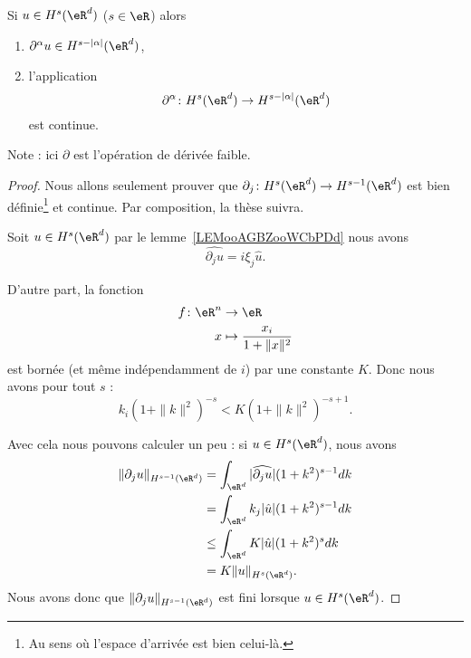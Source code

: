 \begin{proposition}
    Si \( u\in H^s(\eR^d)\) (\( s\in \eR\)) alors
    \begin{enumerate}
        \item
            \( \partial^{\alpha}u\in H^{s-| \alpha |}(\eR^d)\),
        \item
            l'application
            \begin{equation}
                \partial^{\alpha}\colon H^s(\eR^d)\to H^{s-| \alpha |}(\eR^d)
            \end{equation}
            est continue.
    \end{enumerate}
\end{proposition}
Note : ici \( \partial\) est l'opération de dérivée faible.

\begin{proof}
    Nous allons seulement prouver que \( \partial_j\colon H^s(\eR^d)\to  H^{s-1}(\eR^d) \) est bien définie\footnote{Au sens où l'espace d'arrivée est bien celui-là.} et continue. Par composition, la thèse suivra.

    Soit \( u\in H^s(\eR^d)\) par le lemme~\ref{LEMooAGBZooWCbPDd} nous avons
    \begin{equation}
        \widehat{\partial_ju}=i\xi_j\hat u.
    \end{equation}

    D'autre part, la fonction
    \begin{equation}
        \begin{aligned}
            f\colon \eR^n&\to \eR \\
            x&\mapsto \frac{ x_i }{ 1+\| x \|^2 }
        \end{aligned}
    \end{equation}
    est bornée (et même indépendamment de \( i\)) par une constante \( K\). Donc nous avons pour tout \( s\) :
    \begin{equation}
        k_i(1+\| k \|^2)^{-s}<K(1+\| k \|^2)^{-s+1}.
    \end{equation}

    Avec cela nous pouvons calculer un peu : si \( u\in H^s(\eR^d)\), nous avons
    \begin{subequations}
        \begin{align}
            \| \partial_ju \|_{H^{s-1}(\eR^d)}&=\int_{\eR^d}| \widehat{\partial_ju} |(1+k^2)^{s-1}dk\\
            &=\int_{\eR^d}k_j| \hat u |(1+k^2)^{s-1}dk\\
            &\leq \int_{\eR^d}K| \hat u |(1+k^2)^sdk\\
            &=K\| u \|_{H^s(\eR^d)}.
        \end{align}
    \end{subequations}
    Nous avons donc que \( \| \partial_ju \|_{H^{s-1}(\eR^d)}\) est fini lorsque \( u\in H^s(\eR^d)\).


\end{proof}
